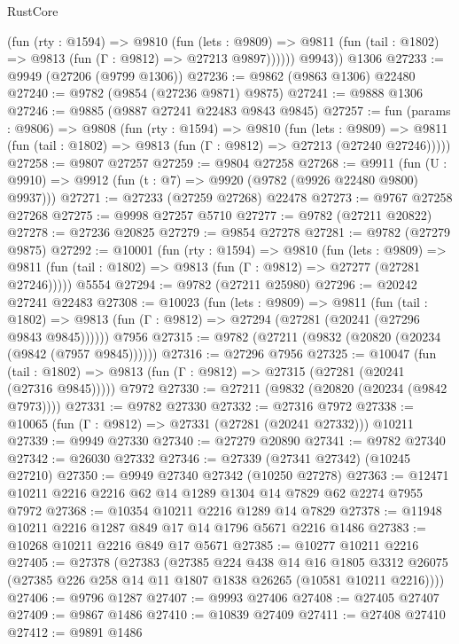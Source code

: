 \begin{lexlean}{RustCore}
\begin{coremodule}
            (fun (rty : @1594) =>
            @9810
              (fun (lets : @9809) =>
              @9811 (fun (tail : @1802) => @9813 (fun (Γ : @9812) => @27213 @9897))))))
        @9943))
    @1306
@27233 := @9949 (@27206 (@9799 @1306))
@27236 := @9862 (@9863 @1306) @22480
@27240 := @9782 (@9854 (@27236 @9871) @9875)
@27241 := @9888 @1306
@27246 := @9885 (@9887 @27241 @22483 @9843 @9845)
@27257 := fun (params : @9806) =>
  @9808
    (fun (rty : @1594) =>
    @9810
      (fun (lets : @9809) =>
      @9811 (fun (tail : @1802) => @9813 (fun (Γ : @9812) => @27213 (@27240 @27246)))))
@27258 := @9807 @27257
@27259 := @9804 @27258
@27268 := @9911
    (fun (U : @9910) => @9912 (fun (t : @7) => @9920 (@9782 (@9926 @22480 @9800) @9937)))
@27271 := @27233 (@27259 @27268) @22478
@27273 := @9767 @27258 @27268
@27275 := @9998 @27257 @5710
@27277 := @9782 (@27211 @20822)
@27278 := @27236 @20825
@27279 := @9854 @27278
@27281 := @9782 (@27279 @9875)
@27292 := @10001
    (fun (rty : @1594) =>
    @9810
      (fun (lets : @9809) =>
      @9811 (fun (tail : @1802) => @9813 (fun (Γ : @9812) => @27277 (@27281 @27246)))))
    @5554
@27294 := @9782 (@27211 @25980)
@27296 := @20242 @27241 @22483
@27308 := @10023
    (fun (lets : @9809) =>
    @9811
      (fun (tail : @1802) =>
      @9813 (fun (Γ : @9812) => @27294 (@27281 (@20241 (@27296 @9843 @9845))))))
    @7956
@27315 := @9782 (@27211 (@9832 (@20820 (@20234 (@9842 (@7957 @9845))))))
@27316 := @27296 @7956
@27325 := @10047
    (fun (tail : @1802) => @9813 (fun (Γ : @9812) => @27315 (@27281 (@20241 (@27316 @9845)))))
    @7972
@27330 := @27211 (@9832 (@20820 (@20234 (@9842 @7973))))
@27331 := @9782 @27330
@27332 := @27316 @7972
@27338 := @10065 (fun (Γ : @9812) => @27331 (@27281 (@20241 @27332))) @10211
@27339 := @9949 @27330
@27340 := @27279 @20890
@27341 := @9782 @27340
@27342 := @26030 @27332
@27346 := @27339 (@27341 @27342) (@10245 @27210)
@27350 := @9949 @27340 @27342 (@10250 @27278)
@27363 := @12471 @10211 @2216 @2216 @62 @14 @1289 @1304 @14 @7829 @62 @2274 @7955 @7972
@27368 := @10354 @10211 @2216 @1289 @14 @7829
@27378 := @11948 @10211 @2216 @1287 @849 @17 @14 @1796 @5671 @2216 @1486
@27383 := @10268 @10211 @2216 @849 @17 @5671
@27385 := @10277 @10211 @2216
@27405 := @27378
    (@27383
      (@27385
        @224
        @438
        @14
        @16
        @1805
        @3312
        @26075
        (@27385 @226 @258 @14 @11 @1807 @1838 @26265 (@10581 @10211 @2216))))
@27406 := @9796 @1287
@27407 := @9993 @27406
@27408 := @27405 @27407
@27409 := @9867 @1486
@27410 := @10839 @27409
@27411 := @27408 @27410
@27412 := @9891 @1486

\end{coremodule}
\end{lexlean}
